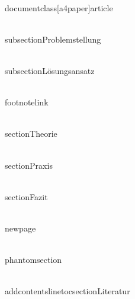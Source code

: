 \\documentclass[a4paper]{article}
\begin{document}
\\subsection{Problemstellung}

\\subsection{Lösungsansatz}

\\footnote{link}

\\section{Theorie}

\\section{Praxis}

\\section{Fazit}















\\newpage

\\phantomsection

\\addcontentsline{toc}{section}{Literatur}
\end{document}

